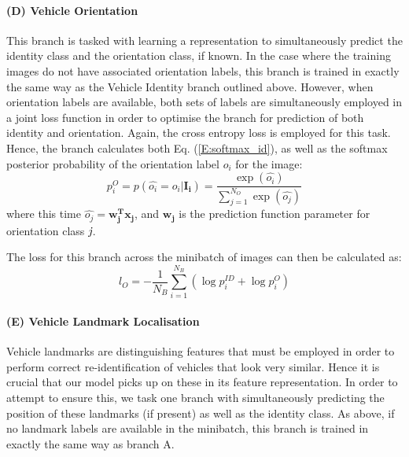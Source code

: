 \documentclass[10pt,twocolumn,letterpaper]{article}
\begin{document}
\paragraph{(D) Vehicle Orientation}

This branch is tasked with learning a representation to simultaneously predict the identity class and the orientation class, if known. In the case where the training images do not have associated orientation labels, this branch is trained in exactly the same way as the Vehicle Identity branch outlined above. However, when orientation labels are available, both sets of labels are simultaneously employed in a joint loss function in order to optimise the branch for prediction of both identity and orientation. Again, the cross entropy loss is employed for this task. Hence, the branch calculates both Eq. (\ref{E:softmax_id}), as well as the softmax posterior probability of the orientation label $o_i$ for the image:
\begin{equation}
  p_i^{O} = p(\hat{o_i} = o_i|\mathbf{I_i}) = \frac{\exp(\hat{o_i})}{\sum_{j=1}^{N_{O}}\exp(\hat{o_j})}
\end{equation}
where this time $\hat{o_j} = \mathbf{w_j^Tx_j}$, and $\mathbf{w_j}$ is the prediction function parameter for orientation class $\emph{j}$.

The loss for this branch across the minibatch of images can then be calculated as:
\begin{equation}
  l_{O} = -\frac{1}{N_B} \sum_{i=1}^{N_B}(\log{p_i^{ID}} + \log{p_i^{O}})
\end{equation}

\paragraph{(E) Vehicle Landmark Localisation}

Vehicle landmarks are distinguishing features that must be employed in order to perform correct  re-identification of vehicles that look very similar. Hence it is crucial that our model picks up on these in its feature representation. In order to attempt to ensure this, we task one branch with simultaneously predicting the position of these landmarks (if present) as well as the identity class. As above, if no landmark labels are available in the minibatch, this branch is trained in exactly the same way as branch A.
\end{document}
